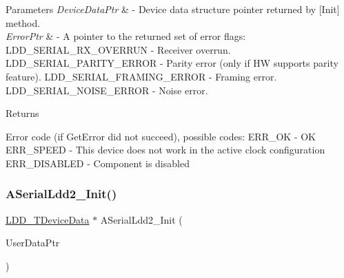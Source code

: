 \begin{DoxyParams}{Parameters}
{\em Device\+Data\+Ptr} & -\/ Device data structure pointer returned by \mbox{[}Init\mbox{]} method. \\
\hline
{\em Error\+Ptr} & -\/ A pointer to the returned set of error flags\+: L\+D\+D\+\_\+\+S\+E\+R\+I\+A\+L\+\_\+\+R\+X\+\_\+\+O\+V\+E\+R\+R\+UN -\/ Receiver overrun. L\+D\+D\+\_\+\+S\+E\+R\+I\+A\+L\+\_\+\+P\+A\+R\+I\+T\+Y\+\_\+\+E\+R\+R\+OR -\/ Parity error (only if HW supports parity feature). L\+D\+D\+\_\+\+S\+E\+R\+I\+A\+L\+\_\+\+F\+R\+A\+M\+I\+N\+G\+\_\+\+E\+R\+R\+OR -\/ Framing error. L\+D\+D\+\_\+\+S\+E\+R\+I\+A\+L\+\_\+\+N\+O\+I\+S\+E\+\_\+\+E\+R\+R\+OR -\/ Noise error. \\
\hline
\end{DoxyParams}
\begin{DoxyReturn}{Returns}

\begin{DoxyItemize}
\item Error code (if Get\+Error did not succeed), possible codes\+: E\+R\+R\+\_\+\+OK -\/ OK E\+R\+R\+\_\+\+S\+P\+E\+ED -\/ This device does not work in the active clock configuration E\+R\+R\+\_\+\+D\+I\+S\+A\+B\+L\+ED -\/ Component is disabled 
\end{DoxyItemize}
\end{DoxyReturn}
\mbox{\label{group___a_serial_ldd2__module_gaa0cd7e49c9c5deb19ce7f9ece16231c3}} 
\subsubsection{\texorpdfstring{A\+Serial\+Ldd2\+\_\+\+Init()}{ASerialLdd2\_Init()}}
{\footnotesize\ttfamily \hyperlink{group___p_e___types__module_gac5cf1362f1f0e3a2ce71b1bf2276d091}{L\+D\+D\+\_\+\+T\+Device\+Data} $\ast$ A\+Serial\+Ldd2\+\_\+\+Init (\begin{DoxyParamCaption}\item[{\hyperlink{group___p_e___types__module_ga0b66a73f87238a782318aa0be7578e35}{L\+D\+D\+\_\+\+T\+User\+Data} $\ast$}]{User\+Data\+Ptr }\end{DoxyParamCaption})}



